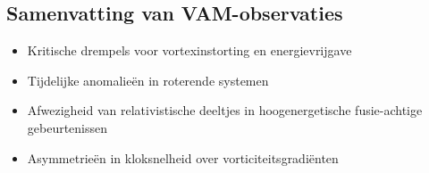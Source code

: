 \subsection{Samenvatting van VAM-observaties}
\begin{itemize}
\item Kritische drempels voor vortexinstorting en energievrijgave
\item Tijdelijke anomalieën in roterende systemen
\item Afwezigheid van relativistische deeltjes in hoogenergetische fusie-achtige gebeurtenissen
\item Asymmetrieën in kloksnelheid over vorticiteitsgradiënten
\end{itemize}